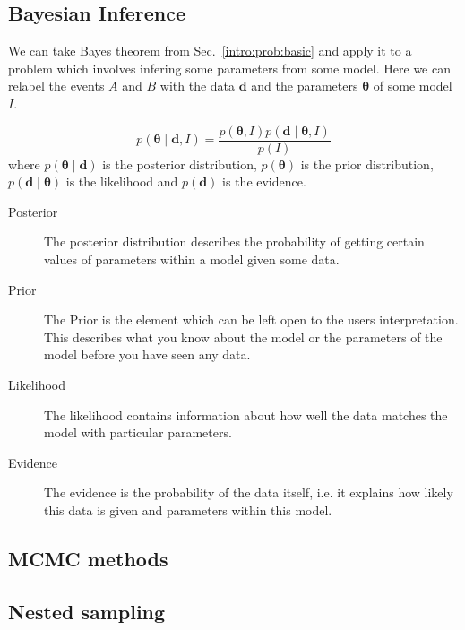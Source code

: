 \subsection{\label{intro:prob:bayes}Bayesian Inference}

We can take Bayes theorem from Sec.~\ref{intro:prob:basic} and apply it to a problem which involves infering some parameters from some model. Here we can relabel the events $A$ and $B$ with the data ${\bm d}$ and the parameters ${\bm \theta}$ of some model $I$.

\begin{equation}
p({\bm \theta} \mid {\bm d}, I) = \frac{p({\bm \theta}, I)p({\bm d} \mid {\bm \theta}, I)}{p(I)}
\end{equation}
where $p({\bm \theta} \mid {\bm d})$ is the posterior distribution, $p({\bm \theta})$ is the prior distribution,  $p({\bm d} \mid {\bm \theta})$ is the likelihood and $p({\bm d})$ is the evidence.

\begin{description}
\item [Posterior]
The posterior distribution describes the probability of getting certain values of parameters within a model given some data. 
\item [Prior]
The Prior is the element which can be left open to the users interpretation. This describes what you know about the model or the parameters of the model before you have seen any data. 
\item [Likelihood]
The likelihood contains information about how well the data matches the model with particular parameters. 
\item [Evidence]
The evidence is the probability of the data itself, i.e. it explains how likely this data is given and parameters within this model. 
\end{description}

\subsection{MCMC methods}

\subsection{Nested sampling}


